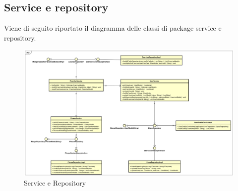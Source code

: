 \subsection{Service e repository}
Viene di seguito riportato il diagramma delle classi di package service e repository.
\begin{figure}[H]
\centering
\includegraphics[width=17cm, keepaspectratio]{img/Service-repository.png} 
\caption{Service e Repository}
\end{figure}